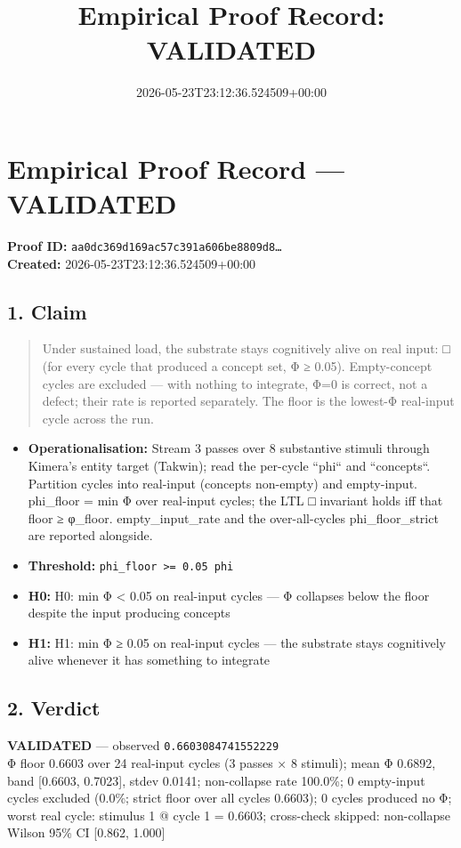 \documentclass{article}
\title{Empirical Proof Record: VALIDATED}
\date{2026-05-23T23:12:36.524509+00:00}
\begin{document}
\maketitle
\section*{Empirical Proof Record --- \textcolor{validated}{\textbf{VALIDATED}}}
\textbf{Proof ID:} \texttt{aa0dc369d169ac57c391a606be8809d8\dots}\\
\textbf{Created:} 2026-05-23T23:12:36.524509+00:00
\subsection*{1. Claim}
\begin{quote}Under sustained load, the substrate stays cognitively alive on real input: □ (for every cycle that produced a concept set, Φ ≥ 0.05). Empty-concept cycles are excluded — with nothing to integrate, Φ=0 is correct, not a defect; their rate is reported separately. The floor is the lowest-Φ real-input cycle across the run.\end{quote}
\begin{itemize}
\item \textbf{Operationalisation:} Stream 3 passes over 8 substantive stimuli through Kimera's entity target (Takwin); read the per-cycle ``phi`` and ``concepts``. Partition cycles into real-input (concepts non-empty) and empty-input. phi\_floor = min Φ over real-input cycles; the LTL □ invariant holds iff that floor ≥ φ\_floor. empty\_input\_rate and the over-all-cycles phi\_floor\_strict are reported alongside.
\item \textbf{Threshold:} \texttt{phi\_floor >= 0.05 phi}
\item \textbf{H0:} H0: min Φ < 0.05 on real-input cycles — Φ collapses below the floor despite the input producing concepts
\item \textbf{H1:} H1: min Φ ≥ 0.05 on real-input cycles — the substrate stays cognitively alive whenever it has something to integrate
\end{itemize}
\subsection*{2. Verdict}
\textcolor{validated}{\textbf{VALIDATED}} --- observed \texttt{0.6603084741552229}\\
Φ floor 0.6603 over 24 real-input cycles (3 passes × 8 stimuli); mean Φ 0.6892, band [0.6603, 0.7023], stdev 0.0141; non-collapse rate 100.0\%; 0 empty-input cycles excluded (0.0\%; strict floor over all cycles 0.6603); 0 cycles produced no Φ; worst real cycle: stimulus 1 @ cycle 1 = 0.6603; cross-check skipped: non-collapse Wilson 95\% CI [0.862, 1.000]
\end{document}
